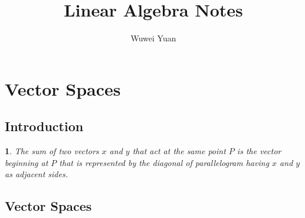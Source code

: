 \documentclass{article}
\theoremstyle{plain}
\theoremstyle{plain} %
\newcommand{\thistheoremname}{}
\newtheorem*{genericthm}{\thistheoremname}
\newenvironment{namedtheorem}[1]
  {\renewcommand{\thistheoremname}{#1}%
   \begin{genericthm}}
  {\end{genericthm}}
\begin{document}
\title{Linear Algebra Notes}

\author{Wuwei Yuan}

\maketitle
\section{Vector Spaces}

\subsection{Introduction}

\begin{namedtheorem}{Parallelogram Law for Vector Addition}
The sum of two vectors $x$ and $y$ that act at the same point $P$ is the vector beginning at $P$ that is
represented by the diagonal of parallelogram having $x$ and $y$ as adjacent sides.
\end{namedtheorem}

\subsection{Vector Spaces}
\end{document}
